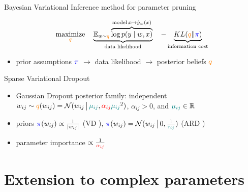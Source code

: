 \documentclass{beamer}
\newcommand{\real}{\mathbb{R}}
\begin{document}
\begin{frame}[c]{\insertsubsection}{\insertsection}
  Bayesian Variational Inference method for parameter pruning \citep{kingma_variational_2015}

  \medskip
  $$
    \underset{
      {\color{orange} q}
    }{\text{maximize}}
    \quad
    \underbrace{
      \mathbb{E}_{w \sim {\color{orange} q}}
        \overbrace{
          \log p(y\mid w, x)  %
        }^{
          \text{model}
          \,
          x\mapsto \hat{y}_w(x)
        }
    }_{
      \text{data likelihood}
    }
    \quad
    - \underbrace{
      KL({\color{orange} q}\|{\color{blue} \pi})
    }_{
      \text{information cost}
    }
    $$
  \medskip
  \begin{itemize}
    \item prior assumptions ${\color{blue} \pi}$
      $\to$ data likelihood
      $\to$ posterior beliefs ${\color{orange} q}$
  \end{itemize}

  \bigskip
  Sparse Variational Dropout \citep{molchanov_variational_2017}
  \begin{itemize}
    \item Gaussian Dropout posterior family: independent $
      w_{ij} \sim {\color{orange} q}(w_{ij})
        = \mathcal{N}(
          w_{ij}\,\big\vert\,
          {\color{teal} \mu_{ij}},
          {\color{red} \alpha_{ij}}
            {\color{teal} \mu_{ij}}^2
        )
    $, $\alpha_{ij} > 0$, and ${\color{teal} \mu_{ij}} \in \real$
    \smallskip
    \item priors $
        {\color{blue} \pi}(w_{ij})
          \propto \frac1{\lvert w_{ij}\rvert}
      $ (VD \citep{molchanov_variational_2017}), $
        {\color{blue} \pi}(w_{ij}) = \mathcal{N}(
          w_{ij}\,\big\vert\,
          0, \tfrac1{{\color{teal} \tau_{ij}}}
        )
      $ (ARD \citep{kharitonov_variational_2018})

    \item parameter importance $\propto \frac1{{\color{red} \alpha_{ij}}}$
  \end{itemize}

\end{frame}



\section{Extension to complex parameters} %
\label{sec:extension_to_complex_parameters}
\end{document}
